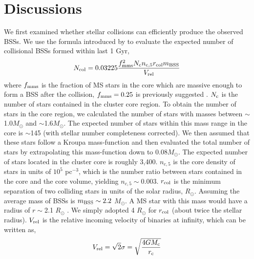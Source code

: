 \documentclass[useAMS,usenatbib,twocolumn]{mnras}
\begin{document}

\section{Discussions}\label{S4}
We first examined whether stellar collisions can efficiently produce the observed BSSs. We use the formula introduced by \cite{Davi04a} to evaluate the expected number of collisional BSSs formed within last 1 Gyr,
\begin{equation}
N_{\rm col}=0.03225\frac{f^2_{\rm mms}N_{\rm c}n_{\rm c,5}r_{\rm col}m_{\rm BSS}}{V_{\rm rel}}
\end{equation}
where $f_{\rm mms}$ is the fraction of MS stars in the core which are massive enough to form a BSS after the collision, $f_{\rm mms}=0.25$ is previously suggested \citep[see e.g.,][]{1995MNRAS.276..876D}. $N_{\rm c}$ is the number of stars contained in the cluster core region. To obtain the number of stars in the core region, we calculated the number of stars with masses between $\sim$1.0$M_{\odot}$ and $\sim$1.6$M_{\odot}$. The expected number of stars within this mass range in the core is $\sim$145 (with stellar number completeness corrected). We then assumed that these stars follow a Kroupa mass-function \citep{Krou01a} and then evaluated the total number of stars by extrapolating this mass-function down to 0.08$M_{\odot}$. The expected number of stars located in the cluster core is roughly 3,400. $n_{c,5}$ is the core density of stars in units of $10^5$ pc$^{-3}$, which is the number ratio between stars contained in the core and the core volume, yielding $n_{c,5}\sim0.003$. $r_{\rm col}$ is the minimum separation of two colliding stars in units of the solar radius, $R_{\odot}$. Assuming the average mass of BSSs is $m_{\rm BSS}\sim2.2$ $M_{\odot}$. A MS star with this mass would have a radius of $r\sim$2.1 $R_{\odot}$ \citep{Demi91a}. We simply adopted 4 $R_{\odot}$ for $r_{\rm col}$ (about twice the stellar radius). $V_{\rm rel}$ is the relative incoming velocity of binaries at infinity, which can be written as, 
\begin{equation}
V_{\rm rel}=\sqrt{2}\sigma=\sqrt{\frac{4GM_{\rm c}}{r_{\rm c}}}
\end{equation}
\end{document}
